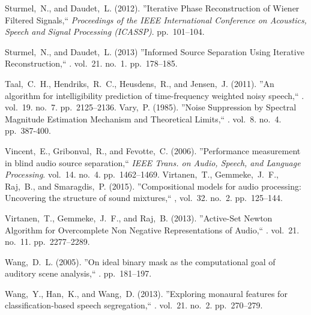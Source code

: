  Sturmel,~N., and Daudet,~L. (2012).
\newblock ''Iterative Phase Reconstruction of Wiener Filtered Signals,`` \newblock
{\em Proceedings of the IEEE International Conference on Acoustics, Speech and
Signal Processing (ICASSP)}. pp.~101--104.

 Sturmel,~N., and Daudet,~L. (2013) \newblock
''Informed Source Separation Using Iterative Reconstruction,`` . vol.~21. no.~1. pp.~178--185.

 Taal,~C.~H., Hendriks,~R.~C., Heusdens,~R., and
Jensen,~J. (2011). \newblock ''An algorithm for intelligibility prediction
of time-frequency weighted noisy speech,`` . vol.~19. no.~7. pp.~2125--2136.
 Vary,~P. (1985). \newblock ''Noise Suppression by Spectral
Magnitude Estimation Mechanism and Theoretical Limits,`` . vol.~8. no.~4. pp.~387-400.

 Vincent,~E., Gribonval,~R., and Fevotte,~C. (2006).
\newblock ''Performance measurement in blind audio source separation,`` \newblock
{\em IEEE Trans. on Audio, Speech, and Language Processing}. vol.~14. no.~4. pp.~1462--1469.
%
 Virtanen,~T., Gemmeke,~J.~F., Raj,~B., and
Smaragdis,~P. (2015). \newblock ''Compositional models for audio processing: Uncovering
the structure of sound mixtures,`` , vol.~32. no.~2. pp.~125--144.

 Virtanen,~T., Gemmeke,~J.~F., and Raj,~B. (2013).
\newblock ''Active-Set Newton Algorithm for Overcomplete Non Negative Representations of Audio,``
. vol.~21. no.~11. pp.~2277--2289.

 Wang,~D.~L. (2005). \newblock ''On ideal binary mask
as the computational goal of auditory scene analysis,`` . pp.~181--197.

%
 Wang,~Y., Han,~K., and Wang,~D. (2013).
\newblock ''Exploring monaural features for classification-based speech
segregation,`` . vol.~21. no.~2. pp.~270--279.

